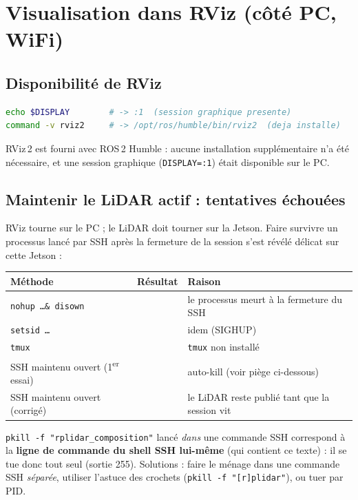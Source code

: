 \documentclass[a4paper,11pt]{article}
\newcommand{\ok}{\textcolor{success}{\checkmark}}
\newcommand{\ko}{\textcolor{danger}{\ding{55}}}
\begin{document}
\section{Visualisation dans RViz (côté PC, WiFi)}
\subsection{Disponibilité de RViz}
\begin{lstlisting}[language=bash]
echo $DISPLAY        # -> :1  (session graphique presente)
command -v rviz2     # -> /opt/ros/humble/bin/rviz2  (deja installe)
\end{lstlisting}
RViz\,2 est fourni avec ROS\,2 Humble : aucune installation supplémentaire
n'a été nécessaire, et une session graphique (\texttt{DISPLAY=:1}) était
disponible sur le PC.

\subsection{Maintenir le LiDAR actif : tentatives échouées}
RViz tourne sur le PC ; le LiDAR doit tourner sur la Jetson. Faire survivre un
processus lancé par SSH après la fermeture de la session s'est révélé délicat
sur cette Jetson :
\begin{center}
\begin{tabularx}{\textwidth}{@{}l c X@{}}
\toprule
Méthode & Résultat & Raison \\
\midrule
\texttt{nohup \ldots \& disown}      & \ko & le processus meurt à la fermeture du SSH \\
\texttt{setsid \ldots}               & \ko & idem (SIGHUP) \\
\texttt{tmux}                        & \ko & \texttt{tmux} non installé \\
SSH maintenu ouvert (1\textsuperscript{er} essai) & \ko & auto-kill (voir piège ci-dessous) \\
SSH maintenu ouvert (corrigé)        & \ok & le LiDAR reste publié tant que la session vit \\
\bottomrule
\end{tabularx}
\end{center}

\begin{tcolorbox}[colback=lightorange,colframe=warning,title=Piège : auto-suppression par pkill]
\texttt{pkill -f "rplidar\_composition"} lancé \emph{dans} une commande SSH
correspond à la \textbf{ligne de commande du shell SSH lui-même} (qui contient ce
texte) : il se tue donc tout seul (sortie 255). Solutions : faire le ménage dans
une commande SSH \emph{séparée}, utiliser l'astuce des crochets
(\texttt{pkill -f "[r]plidar"}), ou tuer par PID.
\end{tcolorbox}
\end{document}
